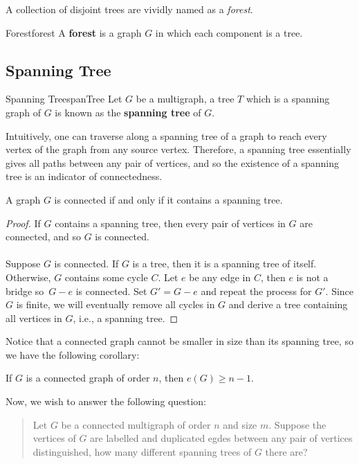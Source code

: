 \documentclass[math]{amznotes}
\theoremstyle{remark}
\begin{document}
A collection of disjoint trees are vividly named as a \textit{forest}.
\begin{dfnbox}{Forest}{forest}
    A {\color{red} \textbf{forest}} is a graph $G$ in which each component is a tree.
\end{dfnbox}

\subsection{Spanning Tree}
\begin{dfnbox}{Spanning Tree}{spanTree}
    Let $G$ be a multigraph, a tree $T$ which is a spanning graph of $G$ is known as the {\color{red} \textbf{spanning tree}} of $G$.
\end{dfnbox}
Intuitively, one can traverse along a spanning tree of a graph to reach every vertex of the graph from any source vertex. Therefore, a spanning tree essentially gives all paths between any pair of vertices, and so the existence of a spanning tree is an indicator of connectedness.
\begin{probox}{}{}
    A graph $G$ is connected if and only if it contains a spanning tree.
    \tcblower
    \begin{proof}
        If $G$ contains a spanning tree, then every pair of vertices in $G$ are connected, and so $G$ is connected.
        \\\\
        Suppose $G$ is connected. If $G$ is a tree, then it is a spanning tree of itself. Otherwise, $G$ contains some cycle $C$. Let $e$ be any edge in $C$, then $e$ is not a bridge so~$G - e$ is connected. Set $G' = G - e$ and repeat the process for $G'$. Since $G$ is finite, we will eventually remove all cycles in $G$ and derive a tree containing all vertices in $G$, i.e., a spanning tree.
    \end{proof}
\end{probox}
Notice that a connected graph cannot be smaller in size than its spanning tree, so we have the following corollary:
\begin{corbox}{}{}
    If $G$ is a connected graph of order $n$, then $e(G) \geq n - 1$.
\end{corbox}
Now, we wish to answer the following question:
\begin{quote}
    Let $G$ be a connected multigraph of order $n$ and size $m$. Suppose the vertices of $G$ are labelled and duplicated egdes between any pair of vertices distinguished, how many different spanning trees of $G$ there are?
\end{quote}
\end{document}
